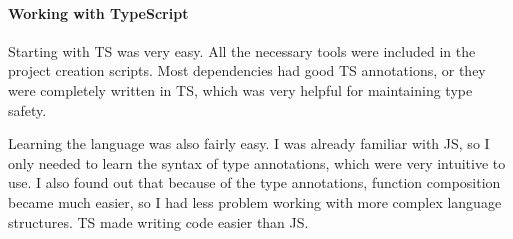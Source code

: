 \paragraph*{Working with TypeScript}\label{sec:working-with-typescript}

Starting with \acl{TS} was very easy.
All the necessary tools were included
in the project creation scripts.
Most dependencies had good \acl{TS} annotations,
or they were completely written in \acl{TS},
which was very helpful for maintaining type safety.

Learning the language was also fairly easy.
I was already familiar with \acl{JS},
so I only needed to learn
the syntax of type annotations,
which were very intuitive to use.
I also found out that because of the type annotations,
function composition became much easier,
so I had less problem working with more complex
language structures.
\Acl{TS} made writing code easier than \acl{JS}.
